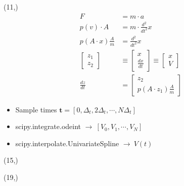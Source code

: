 \documentclass[a0]{a0poster}
\begin{document}
\begin{textblock}{3.5}(11,\GunY)
  \begin{align*}
    F &= m\cdot a \\
    p(v)\cdot A &= m \cdot \frac{d^2}{d t^2} x \\
    p(A\cdot x) \frac{A}{m} &= \frac{d^2}{d t^2} x \\
    \begin{bmatrix}
      z_1 \\ z_2
    \end{bmatrix}
      &\equiv 
        \begin{bmatrix}
          x \\ \frac{dx}{dt}
        \end{bmatrix} \equiv 
        \begin{bmatrix}
          x \\ V
        \end{bmatrix} \\
    \frac{dz}{dt} &= \begin{bmatrix}
                      z_2 \\ p(A\cdot z_1) \frac{A}{m}
                    \end{bmatrix}
  \end{align*}
  \begin{itemize}
  \item Sample times
    $\mathbf{t} = [0, \Delta_t, 2 \Delta_t, \cdots, N \Delta_t]$
  \item scipy.integrate.odeint $\rightarrow~[V_0, V_1, \cdots, V_N]$
  \item scipy.interpolate.UnivariateSpline $\rightarrow~V(t)$
  \end{itemize}

  
\end{textblock}

\begin{textblock}{4}(15,\GunY)
  \\
\end{textblock}

\begin{textblock}{4}(19,\GunY)
  \\
\end{textblock}
\end{document}
